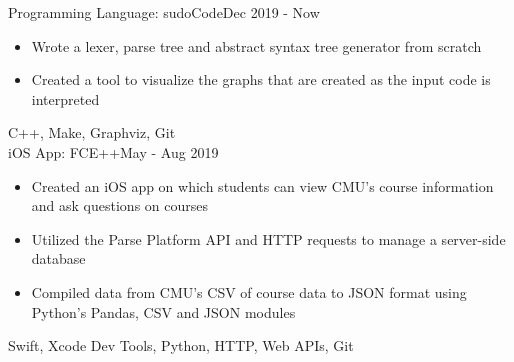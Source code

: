 %
%
%


\begin{projects}

    \project
	{Programming Language: sudoCode}{Dec 2019 - Now}
	{
	    \begin{itemize}
            \item Wrote a lexer, parse tree and abstract syntax tree generator from scratch
            \item Created a tool to visualize the graphs that are created as the input code is interpreted
        \end{itemize}
    }
	{C++, Make, Graphviz, Git} \\

	\project
	{iOS App: FCE++}{May - Aug 2019}
	{
	    \begin{itemize}
            \item Created an iOS app on which students can view CMU’s course information and ask questions on courses
            \item Utilized the Parse Platform API and HTTP requests to manage a server-side database
            \item Compiled data from CMU’s CSV of course data to JSON format using Python’s Pandas, CSV and JSON modules
        \end{itemize}
    }
    {Swift, Xcode Dev Tools, Python, HTTP, Web APIs, Git}

\end{projects}
